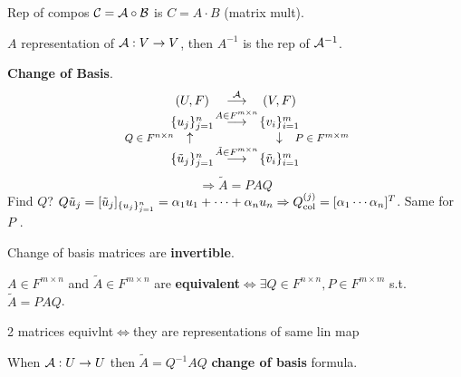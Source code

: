 \begin{Theorem}
Rep of compos $\mathcal{C}=\mathcal{A}\circ\mathcal{B}$ is $C=A\cdot B$ (matrix mult).
\end{Theorem}
\begin{Theorem}
$A$ representation of $\mathcal{A}:V\to V$, then $A^{-1}$ is the rep of $\mathcal{A}^{-1}$.
\end{Theorem}
\textbf{Change of Basis}.
\vspace{-2mm}
\begin{equation*}
\begin{array}{ccc}
(U,F) & \stackrel{\mathclap{\linA}}{\longrightarrow} & (V,F) \\
\basis{u}{j}{n} & \stackrel{\mathclap{A\in F^{m\times n}}}{\longrightarrow} & \basis{v}{i}{m} \vspace{0mm}\\
\begin{matrix}
\text{\hspace{-15mm}\footnotesize$Q\in F^{n\times n}$} & \uparrow & \text{}
\end{matrix} & & \begin{matrix}
\text{} & \downarrow & \text{\footnotesize$P\in F^{m\times m}$\hspace{-15mm}}
\end{matrix} \\
\basis{\tilde u}{j}{n} & \stackrel{\mathclap{\tilde A\in F^{m\times n}}}{\longrightarrow} & \basis{\tilde v}{i}{m}
\end{array}
\end{equation*}
\begin{equation*}
\Rightarrow\tilde A=PAQ
\end{equation*}
Find $Q$? $Q\tilde u_j=[\tilde u_j]_{\{u_{j}\}_{j=1}^{n}}=\alpha_1u_1+\cdots+\alpha_nu_n\Rightarrow Q_{\text{col}}^{(j)}=[\alpha_1\cdots\alpha_n]^T$. Same for $P$ \dSmiley.
\begin{Fact}
Change of basis matrices are \textbf{invertible}.
\end{Fact}
\begin{Definition}
$A\in F^{m\times n}$ and $\tilde A\in F^{m\times n}$ are \textbf{equivalent}$\Leftrightarrow\exists Q\in F^{n\times n},P\in F^{m\times m}$ s.t. $\tilde A=PAQ$.
\end{Definition}
\begin{Theorem}
2 matrices equivlnt$\Leftrightarrow$they are representations of same lin map
\end{Theorem}
When $\mathcal{A}:U\to U$ then $\tilde A=Q^{-1}AQ$ \textbf{change of basis} formula.
